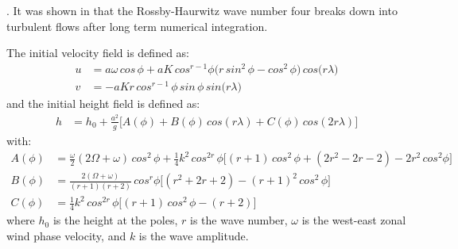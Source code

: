 \documentclass[a4paper, 12pt, notitlepage]{report}
\begin{document}
  \cite{williamson1992standard}. It was shown in \cite{thuburn2000numerical}
  that the Rossby-Haurwitz wave number four breaks down into turbulent flows
  after long term numerical integration.
  \par
  The initial velocity field is defined as:
  \begin{equation} \label{ivf}
    \begin{split}
      u &= a\omega\, cos\, \phi + a K\, cos^{r-1}\phi\big(r\, sin^2\,
      \phi-cos^2\, \phi\big)\, cos\big(r\lambda\big) \\
      v &= -a K r\, cos^{r-1}\, \phi\, sin\, \phi\, sin\big(r\lambda\big)
    \end{split}
  \end{equation}
  and the initial height field is defined as:
  \begin{equation} \label{ihf}
    \begin{split}
      h &= h_0 + \frac{a^2}{g}\big[A(\phi)+B(\phi)\,cos(r\lambda) + C(\phi)\,
        cos(2r\lambda)\big]
    \end{split}
  \end{equation}
  with:
  \begin{equation} \label{rhwabc}
    \begin{split}
      A(\phi) &= \frac{\omega}{2}(2\Omega+\omega)\, cos^2\, \phi +
      \frac{1}{4}k^2\,cos^{2r}\,\phi\big[(r+1)\, cos^2\,\phi +
        (2r^2-2r-2)-2r^2\,cos^2\phi\big] \\
      B(\phi) &= \frac{2(\Omega +
        \omega)}{(r+1)(r+2)}\,cos^r\phi\big[(r^2+2r+2)-(r+1)^2\,cos^2\,\phi\big]
      \\
      C(\phi) &= \frac{1}{4}k^2\, cos^{2r}\, \phi\big[(r+1)\, cos^2\,\phi - (r+2)\big]
    \end{split}
  \end{equation}
  where \(h_0\) is the height at the poles, \(r\) is the wave number, \(\omega\) is the
  west-east zonal wind phase velocity, and \(k\) is the wave amplitude.
\end{document}
